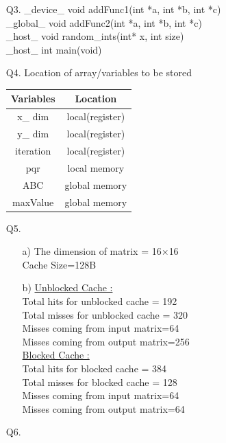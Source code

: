 \documentclass[letterpaper]{article}
\begin{document}
\begin{large}
\begin{flushleft}
\begin{enumerate}
\item[Q3. ]
\_device\_ void addFunc1(int *a, int *b, int *c)\\[0.1in]
\_global\_ void addFunc2(int *a, int *b, int *c)\\[0.1in]
\_host\_ void random\_ints(int* x, int size)\\[0.1in] 
\_host\_ int main(void)\\[0.1in]
\item[Q4. ]
Location of array/variables to be stored\\
\begin{table}[h]
\centering
\begin{tabular}{|c|c|}
\hline
Variables & Location\\
\hline
x\_ dim & local(register)\\
\hline
y\_ dim & local(register)\\
\hline
iteration & local(register)\\
\hline
pqr & local memory \\
\hline
ABC & global memory\\
\hline
maxValue & global memory\\
\hline
\end{tabular}
\end{table}
\item[Q5. ]
\begin{enumerate}
\item[a) ]
The dimension of matrix = 16$\times$16\\[0.1in]
Cache Size=128B\\[0.1in]
\item[b) ]
\underline{Unblocked Cache :}\\[0.1in]
Total hits for unblocked cache = 192\\[0.1in]
Total misses for unblocked cache = 320\\[0.1in]
Misses coming from input matrix=64\\[0.1in]
Misses coming from output matrix=256\\[0.1in]
\underline{Blocked Cache :}\\[0.1in]
Total hits for blocked cache = 384\\[0.1in]
Total misses for blocked cache = 128\\[0.1in]
Misses coming from input matrix=64\\[0.1in]
Misses coming from output matrix=64\\[0.1in]
\end{enumerate}
\item[Q6. ]

\end{enumerate}
\end{flushleft}
\end{large}
\end{document}
